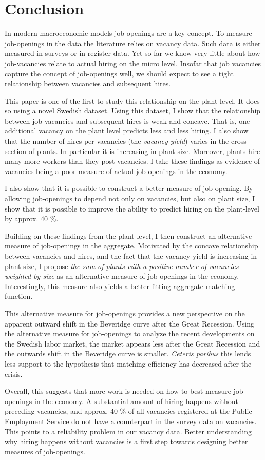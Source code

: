 \section{Conclusion}
\label{sec:conclusion}

In modern macroeconomic models job-openings are a key concept. To measure job-openings in the data the literature relies on vacancy data. Such data is either measured in surveys or in register data. Yet so far we know very little about how job-vacancies relate to actual hiring on the micro level. Insofar that job vacancies capture the concept of job-openings well, we should expect to see a tight relationship between vacancies and subsequent hires.
 
This paper is one of the first to study this relationship on the plant level. It does so using a novel Swedish dataset. Using this dataset, I show that the relationship between job-vacancies and subsequent hires is weak and concave. That is, one additional vacancy on the plant level predicts less and less hiring. I also show that the number of hires per vacancies (the \emph{vacancy yield}) varies in the cross-section of plants. In particular it is increasing in plant size. Moreover, plants hire many more workers than they post vacancies. I take these findings as evidence of vacancies being a poor measure of actual job-openings in the economy. 

I also show that it is possible to construct a better measure of job-opening. By allowing job-openings to depend not only on vacancies, but also on plant size, I show that it is possible to improve the ability to predict hiring on the plant-level by approx. 40 \%. 

Building on these findings from the plant-level, I then construct an alternative measure of job-openings in the aggregate. Motivated by the concave relationship between vacancies and hires, and the fact that the vacancy yield is increasing in plant size, I propose \emph{the sum of plants with a positive number of vacancies weighted by size} as an alternative measure of job-openings in the economy. Interestingly, this measure also yields a better fitting aggregate matching function.

This alternative measure for job-openings provides a new perspective on the apparent outward shift in the Beveridge curve after the Great Recession. Using the alternative measure for job-openings to analyze the recent developments on the Swedish labor market, the market appears less after the Great Recession and the outwards shift in the Beveridge curve is smaller. \emph{Ceteris paribus} this lends less support to the hypothesis that matching efficiency has decreased after the crisis. 

Overall, this suggests that more work is needed on how to best measure job-openings in the economy. A substantial amount of hiring happens without preceding vacancies, and approx. 40 \% of all vacancies registered at the Public Employment Service do not have a counterpart in the survey data on vacancies. This points to a reliability problem in our vacancy data. Better understanding why hiring happens without vacancies is a first step towards designing better measures of job-openings.
